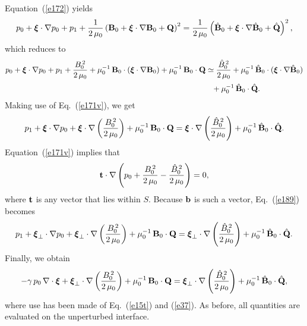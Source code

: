 \documentclass[12pt,prb,aps,notitlepage]{revtex4-1}
\newcommand{\bxi}{\mbox{\boldmath$\xi$}}
\begin{document}
Equation~(\ref{e172}) yields
\begin{align}
p_0 + \bxi\cdot\nabla p_0+p_1 + \frac{1}{2\,\mu_0}\left({\bf B}_0 + \bxi\cdot\nabla{\bf B}_0+{\bf Q}\right)^2=  \frac{1}{2\,\mu_0}\left(\hat{\bf B}_0 + \bxi\cdot\nabla\hat{\bf B}_0+\hat{\bf Q}\right)^2,
\end{align}
which reduces to
\begin{align}
p_0 + \bxi\cdot\nabla p_0+p_1 +\frac{B_0^{\,2}}{2\,\mu_0} + \mu_0^{-1}\,{\bf B}_0\cdot (\bxi\cdot\nabla{\bf B}_0)+\mu_0^{-1}\,{\bf B}_0\cdot {\bf Q}&\simeq 
\frac{\hat{B}_0^{\,2}}{2\,\mu_0} + \mu_0^{-1}\,\hat{\bf B}_0\cdot (\bxi\cdot\nabla\hat{\bf B}_0)\nonumber\\[0.5ex]&\phantom{=}+\mu_0^{-1}\,\hat{\bf B}_0\cdot \hat{\bf Q}.
\end{align}
Making use of Eq.~(\ref{e171v}), we get
\begin{equation}\label{e189}
p_1  + \bxi\cdot\nabla p_0+\bxi\cdot\nabla\left(\frac{B_0^{\,2}}{2\,\mu_0}\right)+ \mu_0^{-1}\,{\bf B}_0\cdot {\bf Q}=
  \bxi\cdot\nabla\left(\frac{\hat{B}_0^{\,2}}{2\,\mu_0}\right) +\mu_0^{-1}\,\hat{\bf B}_0\cdot \hat{\bf Q}.
\end{equation}
Equation~(\ref{e171v}) implies that
\begin{equation}
{\bf t}\cdot\nabla\left(p_0+\frac{B_0^{\,2}}{2\,\mu_0}-\frac{\hat{B}_0^{\,2}}{2\,\mu_0}\right)=0,
\end{equation}
where ${\bf t}$ is any vector that lies within $S$. Because ${\bf b}$ is such a vector, Eq.~(\ref{e189}) becomes 
\begin{equation}
p_1  + \bxi_\perp\cdot\nabla p_0+\bxi_\perp\cdot\nabla\left(\frac{B_0^{\,2}}{2\,\mu_0}\right)+ \mu_0^{-1}\,{\bf B}_0\cdot {\bf Q}=
  \bxi_\perp\cdot\nabla\left(\frac{\hat{B}_0^{\,2}}{2\,\mu_0}\right) +\mu_0^{-1}\,\hat{\bf B}_0\cdot \hat{\bf Q}.
\end{equation}
Finally, we obtain
\begin{equation}
-\gamma\,p_0\,\nabla\cdot \bxi + \bxi_\perp\cdot\nabla\left(\frac{B_0^{\,2}}{2\,\mu_0}\right)+ \mu_0^{-1}\,{\bf B}_0\cdot {\bf Q}=
  \bxi_\perp\cdot\nabla\left(\frac{\hat{B}_0^{\,2}}{2\,\mu_0}\right) +\mu_0^{-1}\,\hat{\bf B}_0\cdot \hat{\bf Q},
\end{equation}
where use has been made of Eq.~(\ref{e15t}) and (\ref{e37}). As before, all quantities are evaluated on the unperturbed interface. 
\end{document}
